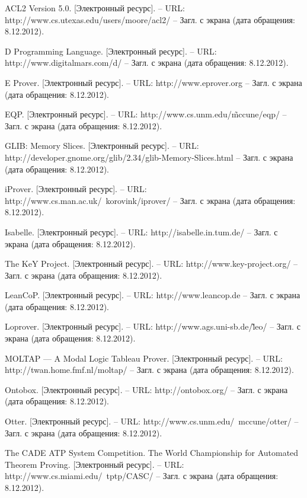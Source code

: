 \begin{thebibliography}{99}

 ACL2 Version 5.0. [Электронный ресурс]. -- URL: http://www.cs.utexas.edu/users/moore/acl2/ -- Загл. с экрана (дата обращения: 8.12.2012).

 D Programming Language. [Электронный ресурс]. -- URL: http://www.digitalmars.com/d/ -- Загл. с экрана (дата обращения: 8.12.2012).

 E Prover. [Электронный ресурс]. -- URL: http://www.eprover.org -- Загл. с экрана (дата обращения: 8.12.2012).

 EQP. [Электронный ресурс]. -- URL: http://www.cs.unm.edu/\~mccune/eqp/ -- Загл. с экрана (дата обращения: 8.12.2012).

 GLIB: Memory Slices. [Электронный ресурс]. -- URL: http://developer.gnome.org/glib/2.34/glib-Memory-Slices.html -- Загл. с экрана (дата обращения: 8.12.2012).

 iProver. [Электронный ресурс]. -- URL: http://www.cs.man.ac.uk/~korovink/iprover/ -- Загл. с экрана (дата обращения: 8.12.2012).

 Isabelle. [Электронный ресурс]. -- URL: http://isabelle.in.tum.de/ -- Загл. с экрана (дата обращения: 8.12.2012).

 The KeY Project. [Электронный ресурс]. -- URL: http://www.key-project.org/ -- Загл. с экрана (дата обращения: 8.12.2012).

 LeanCoP. [Электронный ресурс]. -- URL: http://www.leancop.de -- Загл. с экрана (дата обращения: 8.12.2012).

 Loprover. [Электронный ресурс]. -- URL: http://www.ags.uni-sb.de/\~leo/ -- Загл. с экрана (дата обращения: 8.12.2012).

 MOLTAP — A Modal Logic Tableau Prover. [Электронный ресурс]. -- URL: http://twan.home.fmf.nl/moltap/ -- Загл. с экрана (дата обращения: 8.12.2012).

 Ontobox. [Электронный ресурс]. -- URL: http://ontobox.org/ -- Загл. с экрана (дата обращения: 8.12.2012).

 Otter. [Электронный ресурс]. -- URL: http://www.cs.unm.edu/~mccune/otter/ -- Загл. с экрана (дата обращения: 8.12.2012).

 The CADE ATP System Competition. The World Championship for Automated Theorem Proving. [Электронный ресурс]. -- URL: http://www.cs.miami.edu/~tptp/CASC/ -- Загл. с экрана (дата обращения: 8.12.2012).


\end{thebibliography}

